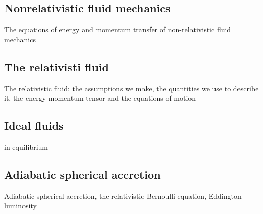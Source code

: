 \documentclass[main.tex]{subfiles}
\begin{document}
\subsection{Nonrelativistic fluid mechanics}

The equations of energy and momentum transfer of non-relativistic fluid mechanics

\subsection{The relativisti fluid}

The relativistic fluid: the assumptions we make, the quantities we use to describe it, the energy-momentum tensor and the equations of motion

\subsection{Ideal fluids}

in equilibrium


\subsection{Adiabatic spherical accretion}

Adiabatic spherical accretion, the relativistic Bernoulli equation, Eddington luminosity
\end{document}
